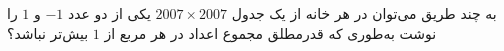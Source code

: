 \EXERCISE
به چند طریق می‌توان در هر خانه از یک جدول
$2007 \times 2007$
یکی از دو عدد
$-1$
و
$1$
را نوشت به‌طوری که قدرمطلق مجموع اعداد در هر مربع از
$1$
بیش‌تر نباشد؟